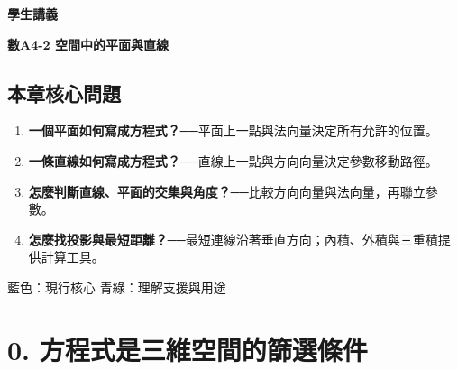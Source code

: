 \documentclass[11pt,a4paper]{article}
\providecommand{\tightlist}{%
  \setlength{\itemsep}{0pt}\setlength{\parskip}{0pt}}
\begin{document}
\begin{tcolorbox}[
  enhanced,colback=white,colframe=HandoutBlue,boxrule=1.1pt,arc=2mm,
  borderline west={3pt}{0pt}{HandoutBlue},left=5mm,right=4mm,top=4mm,bottom=4mm
]
{\sffamily\small\bfseries\color{HandoutBlue}學生講義}\par
{\sffamily\bfseries\LARGE\color{HandoutInk}數A4-2 空間中的平面與直線}\par
\vspace{0.35em}{\large 用方程式描述三維幾何，再由向量求交集、投影、角度與最短距離}\par
{}\par
{}\par
\end{tcolorbox}


\begin{HandoutLearningMap}

\subsection{本章核心問題}\label{ux672cux7ae0ux6838ux5fc3ux554fux984c}

\begin{enumerate}
\def\labelenumi{\arabic{enumi}.}
\tightlist
\item
  \textbf{一個平面如何寫成方程式？}──平面上一點與法向量決定所有允許的位置。
\item
  \textbf{一條直線如何寫成方程式？}──直線上一點與方向向量決定參數移動路徑。
\item
  \textbf{怎麼判斷直線、平面的交集與角度？}──比較方向向量與法向量，再聯立參數。
\item
  \textbf{怎麼找投影與最短距離？}──最短連線沿著垂直方向；內積、外積與三重積提供計算工具。
\end{enumerate}

{藍色：現行核心}
{青綠：理解支援與用途}

\end{HandoutLearningMap}

\section{0. 方程式是三維空間的篩選條件}\label{ux65b9ux7a0bux5f0fux662fux4e09ux7dadux7a7aux9593ux7684ux7be9ux9078ux689dux4ef6}
\end{document}
